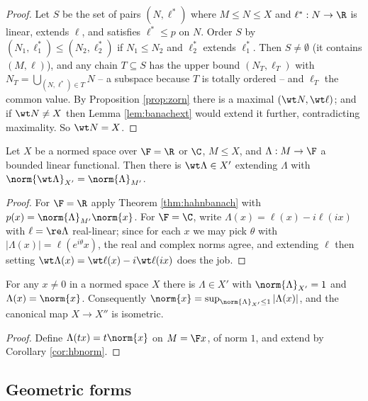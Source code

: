 \begin{proof}
	Let $S$ be the set of pairs $(N, \ell^*)$ where $M \le N \le X$ and $\ell^* : N \to \R$ is linear, extends $\ell$, and satisfies $\ell^* \le p$ on $N$. Order $S$ by $(N_1,\ell_1^*) \le (N_2,\ell_2^*)$ if $N_1 \le N_2$ and $\ell_2^*$ extends $\ell_1^*$. Then $S \ne \emptyset$ (it contains $(M,\ell)$), and any chain $T \subseteq S$ has the upper bound $(N_T, \ell_T)$ with $N_T = \bigcup_{(N,\ell^*) \in T} N$ -- a subspace because $T$ is totally ordered -- and $\ell_T$ the common value. By Proposition \ref{prop:zorn} there is a maximal $(\wt N, \wt\ell)$; and if $\wt N \ne X$ then Lemma \ref{lem:banachext} would extend it further, contradicting maximality. So $\wt N = X$.
\end{proof}

\begin{corollary}\label{cor:hbnorm}
	Let $X$ be a normed space over $\F = \R$ or $\C$, $M \le X$, and $\Lambda : M \to \F$ a bounded linear functional. Then there is $\wt \Lambda \in X'$ extending $\Lambda$ with $\norm{\wt\Lambda}_{X'} = \norm{\Lambda}_{M'}$.
\end{corollary}

\begin{proof}
	For $\F = \R$ apply Theorem \ref{thm:hahnbanach} with $p(x) = \norm{\Lambda}_{M'}\norm{x}$. For $\F = \C$, write $\Lambda(x) = \ell(x) - i\ell(ix)$ with $\ell = \re \Lambda$ real-linear; since for each $x$ we may pick $\theta$ with $|\Lambda(x)| = \ell(e^{i\theta}x)$, the real and complex norms agree, and extending $\ell$ then setting $\wt\Lambda(x) = \wt\ell(x) - i\wt\ell(ix)$ does the job.
\end{proof}

\begin{corollary}\label{cor:hbnormattained}
	For any $x \ne 0$ in a normed space $X$ there is $\Lambda \in X'$ with $\norm{\Lambda}_{X'} = 1$ and $\Lambda(x) = \norm{x}$. Consequently $\norm{x} = \sup_{\norm{\Lambda}_{X'}\le 1}|\Lambda(x)|$, and the canonical map $X \to X''$ is isometric.
\end{corollary}

\begin{proof}
	Define $\Lambda(tx) = t\norm{x}$ on $M = \F x$, of norm $1$, and extend by Corollary \ref{cor:hbnorm}.
\end{proof}

\subsection{Geometric forms}


